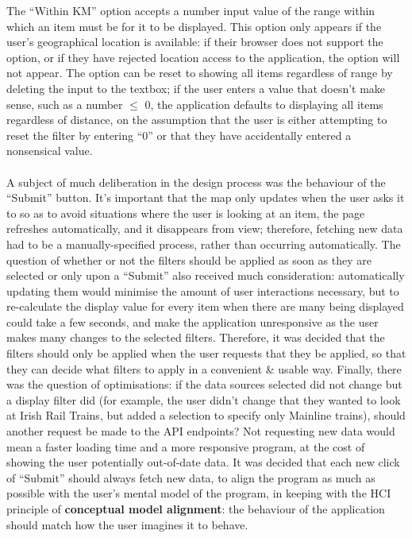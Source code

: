 \documentclass[a4paper,11pt]{report}
\begin{document}
The ``Within KM'' option accepts a number input value of the range within which an item must be for it to be displayed.
This option only appears if the user's geographical location is available: if their browser does not support the option, or if they have rejected location access to the application, the option will not appear.
The option can be reset to showing all items regardless of range by deleting the input to the textbox;
if the user enters a value that doesn't make sense, such as a number $\leq$ 0, the application defaults to displaying all items regardless of distance, on the assumption that the user is either attempting to reset the filter by entering ``0'' or that they have accidentally entered a nonsensical value.
\\\\
A subject of much deliberation in the design process was the behaviour of the ``Submit'' button.
It's important that the map only updates when the user asks it to so as to avoid situations where the user is looking at an item, the page refreshes automatically, and it disappears from view;
therefore, fetching new data had to be a manually-specified process, rather than occurring automatically.
The question of whether or not the filters should be applied as soon as they are selected or only upon a ``Submit'' also received much consideration:
automatically updating them would minimise the amount of user interactions necessary, but to re-calculate the display value for every item when there are many being displayed could take a few seconds, and make the application unresponsive as the user makes many changes to the selected filters.
Therefore, it was decided that the filters should only be applied when the user requests that they be applied, so that they can decide what filters to apply in a convenient \& usable way.
Finally, there was the question of optimisations:
if the data sources selected did not change but a display filter did (for example, the user didn't change that they wanted to look at Irish Rail Trains, but added a selection to specify only Mainline trains), should another request be made to the API endpoints?
Not requesting new data would mean a faster loading time and a more responsive program, at the cost of showing the user potentially out-of-date data.
It was decided that each new click of ``Submit'' should always fetch new data, to align the program as much as possible with the user's mental model of the program, in keeping with the HCI principle of \textbf{conceptual model alignment}\supercite{norman_design_2013}: the behaviour of the application should match how the user imagines it to behave.
\end{document}
